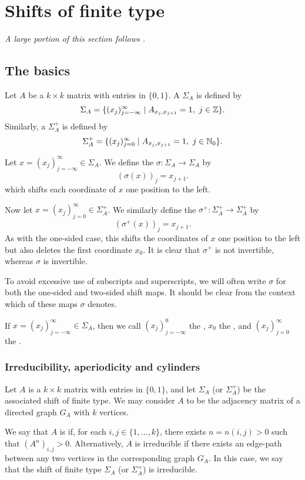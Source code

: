 \section{Shifts of finite type}
\emph{A large portion of this section follows \cite[Chapter 1]{parry-pollicott:zeta-fns-periodic-orbits}.}
\subsection{The basics}
Let $A$ be a $k \times k$ matrix with entries in $\{0, 1\}$. A  $\Sigma_A$ is defined by
\[
	\Sigma_A = \{(x_j)_{j = -\infty}^\infty \mid A_{x_j, x_{j + 1}} = 1,\ j \in \mathbb{Z}\}.
\]
Similarly, a  $\Sigma_A^+$ is defined by
\[
	\Sigma_A^+ = \{(x_j)_{j = 0}^\infty \mid A_{x_j, x_{j + 1}} = 1,\ j \in \mathbb{N}_0\}.
\]

Let $x = (x_j)_{j = -\infty}^\infty \in \Sigma_A$. We define the  $\sigma : \Sigma_A \to \Sigma_A$ by
\[
	(\sigma(x))_j = x_{j + 1}.
\]
which shifts each coordinate of $x$ one position to the left.

Now let $x = (x_j)_{j = 0}^\infty \in \Sigma_A^+$. We similarly define the  $\sigma^+ : \Sigma_A^+ \to \Sigma_A^+$ by
\[
	(\sigma^+(x))_j = x_{j + 1}.
\]
As with the one-sided case, this shifts the coordinates of $x$ one position to the left but also deletes the first coordinate $x_0$. It is clear that $\sigma^+$ is not invertible, whereas $\sigma$ is invertible.

To avoid excessive use of subscripts and superscripts, we will often write $\sigma$ for both the one-sided and two-sided shift maps. It should be clear from the context which of these maps $\sigma$ denotes.

If $x = (x_j)_{j = -\infty}^\infty \in \Sigma_A$, then we call $(x_j)_{j = -\infty}^0$ the , $x_0$ the , and $(x_j)_{j = 0}^\infty$ the .

\subsubsection{Irreducibility, aperiodicity and cylinders}
Let $A$ is a $k \times k$ matrix with entries in $\{0, 1\}$, and let $\Sigma_A$ (or $\Sigma_A^+$) be the associated shift of finite type. We may consider $A$ to be the adjacency matrix of a directed graph $G_A$ with $k$ vertices.

We say that $A$ is  if, for each $i, j \in \{1, \dots, k\}$, there exists $n = n(i, j) > 0$ such that $(A^n)_{i, j} > 0$. Alternatively, $A$ is irreducible if there exists an edge-path between any two vertices in the corresponding graph $G_A$. In this case, we say that the shift of finite type $\Sigma_A$ (or $\Sigma_A^+$) is irreducible.

